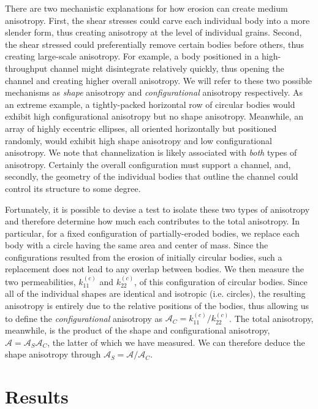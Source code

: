 \documentclass[3p]{elsarticle}
\newcommand{\anis}{\mathcal{A}}
\begin{document}
There are two mechanistic explanations for how erosion can create medium anisotropy. First, the shear stresses could carve each individual body into a more slender form, thus creating anisotropy at the level of individual grains. Second, the shear stressed could preferentially remove certain bodies before others, thus creating large-scale anisotropy. For example, a body positioned in a high-throughput channel might disintegrate relatively quickly, thus opening the channel and creating higher overall anisotropy. We will refer to these two possible mechanisms as {\em shape} anisotropy and {\em configurational} anisotropy respectively. As an extreme example, a tightly-packed horizontal row of circular bodies would exhibit high configurational anisotropy but no shape anisotropy. Meanwhile, an array of highly eccentric ellipses, all oriented horizontally but positioned randomly, would exhibit high shape anisotropy and low configurational anisotropy. We note that channelization is likely associated with {\em both} types of anisotropy. Certainly the overall configuration must support a channel, and, secondly, the geometry of the individual bodies that outline the channel could control its structure to some degree.

	Fortunately, it is possible to devise a test to isolate these two types of anisotropy and therefore determine how much each contributes to the total anisotropy. In particular, for a fixed configuration of partially-eroded bodies, we replace each body with a circle having the same area and center of mass. Since the configurations resulted from the erosion of initially circular bodies, such a replacement does not lead to any overlap between bodies. We then measure the two permeabilities, $k_{11}^{(c)}$ and $ k_{22}^{(c)}$, of this configuration of circular bodies. Since all of the individual shapes are identical and isotropic (i.e. circles), the resulting anisotropy is entirely due to the relative positions of the bodies, thus allowing us to define the {\em configurational} anisotropy as $\anis_C = k_{11}^{(c)} / k_{22}^{(c)}$. The total anisotropy, meanwhile, is the product of the shape and configurational anisotropy, $\anis = \anis_S \anis_C$, the latter of which we have measured. We can therefore deduce the shape anisotropy through $\anis_S = \anis/\anis_C$.

\section{Results}
\label{sec:results}
\end{document}
